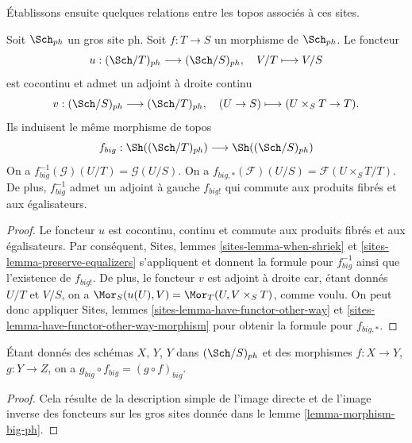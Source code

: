 \noindent
Établissons ensuite quelques relations entre les topos
associés à ces sites.

\begin{lemma}
\label{lemma-morphism-big-ph}
Soit $\Sch_{ph}$ un gros site ph.
Soit $f : T \to S$ un morphisme de $\Sch_{ph}$.
Le foncteur
$$
u : (\Sch/T)_{ph} \longrightarrow (\Sch/S)_{ph},
\quad
V/T \longmapsto V/S
$$
est cocontinu et admet un adjoint à droite continu
$$
v : (\Sch/S)_{ph} \longrightarrow (\Sch/T)_{ph},
\quad
(U \to S) \longmapsto (U \times_S T \to T).
$$
Ils induisent le même morphisme de topos
$$
f_{big} :
\Sh((\Sch/T)_{ph})
\longrightarrow
\Sh((\Sch/S)_{ph})
$$
On a $f_{big}^{-1}(\mathcal{G})(U/T) = \mathcal{G}(U/S)$.
On a $f_{big, *}(\mathcal{F})(U/S) = \mathcal{F}(U \times_S T/T)$.
De plus, $f_{big}^{-1}$ admet un adjoint à gauche $f_{big!}$ qui commute aux
produits fibrés et aux égalisateurs.
\end{lemma}

\begin{proof}
Le foncteur $u$ est cocontinu, continu et commute aux produits fibrés
et aux égalisateurs. Par conséquent,
Sites, lemmes \ref{sites-lemma-when-shriek} et
\ref{sites-lemma-preserve-equalizers}
s'appliquent et donnent la formule
pour $f_{big}^{-1}$ ainsi que l'existence de $f_{big!}$. De plus,
le foncteur $v$ est adjoint à droite car, étant donnés $U/T$ et $V/S$,
on a $\Mor_S(u(U), V) = \Mor_T(U, V \times_S T)$,
comme voulu. On peut donc appliquer
Sites, lemmes \ref{sites-lemma-have-functor-other-way} et
\ref{sites-lemma-have-functor-other-way-morphism} pour obtenir la
formule pour $f_{big, *}$.
\end{proof}

\begin{lemma}
\label{lemma-composition-ph}
Étant donnés des schémas $X$, $Y$, $Y$ dans $(\Sch/S)_{ph}$
et des morphismes $f : X \to Y$, $g : Y \to Z$, on a
$g_{big} \circ f_{big} = (g \circ f)_{big}$.
\end{lemma}

\begin{proof}
Cela résulte de la description simple de l'image directe
et de l'image inverse des foncteurs sur les gros sites donnée dans le
lemme \ref{lemma-morphism-big-ph}.
\end{proof}



































